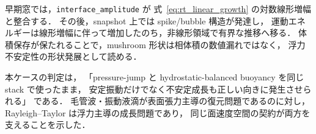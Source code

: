 早期窓では，\texttt{interface\_amplitude} が
式~\eqref{eq:rt_linear_growth} の対数線形増幅と整合する．
その後，snapshot 上では spike/bubble 構造が発達し，
運動エネルギーは線形増幅に伴って増加したのち，非線形領域で有界な推移へ移る．
体積保存が保たれることで，mushroom 形状は相体積の数値漏れではなく，
浮力不安定性の形状発展として読める．

本ケースの判定は，
「pressure-jump と hydrostatic-balanced buoyancy を同じ stack で使ったまま，
安定振動だけでなく不安定成長も正しい向きに発生させられる」
である．
毛管波・振動液滴が表面張力主導の復元問題であるのに対し，
Rayleigh--Taylor は浮力主導の成長問題であり，
同じ面速度空間の契約が両方を支えることを示した．


